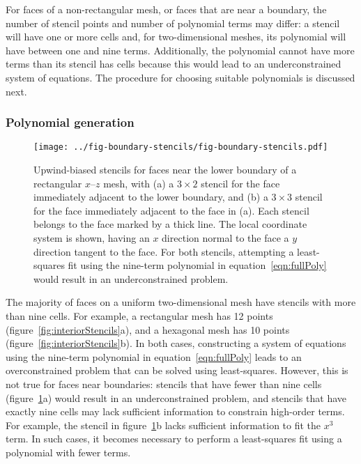 For faces of a non-rectangular mesh, or faces that are near a boundary, the number of stencil points and number of polynomial terms may differ: a stencil will have one or more cells and, for two-dimensional meshes, its polynomial will have between one and nine terms.  Additionally, the polynomial cannot have more terms than its stencil has cells because this would lead to an underconstrained system of equations.  The procedure for choosing suitable polynomials is discussed next.

\subsubsection{Polynomial generation}
\begin{figure}
	\centering
	\texttt{[image: ../fig-boundary-stencils/fig-boundary-stencils.pdf]}
	\caption{Upwind-biased stencils for faces near the lower boundary of a rectangular $x$--$z$ mesh, with (a) a $3 \times 2$ stencil for the face immediately adjacent to the lower boundary, and (b) a $3 \times 3$ stencil for the face immediately adjacent to the face in (a).  Each stencil belongs to the face marked by a thick line.  The local coordinate system is shown, having an $x$ direction normal to the face a $y$ direction tangent to the face.  For both stencils, attempting a least-squares fit using the nine-term polynomial in equation~\eqref{eqn:fullPoly} would result in an underconstrained problem.
	}
	\label{fig:boundaryStencils}
\end{figure}

The majority of faces on a uniform two-dimensional mesh have stencils with more than nine cells.  For example, a rectangular mesh has 12 points (figure~\ref{fig:interiorStencils}a), and a hexagonal mesh has 10 points (figure~\ref{fig:interiorStencils}b).
In both cases, constructing a system of equations using the nine-term polynomial in equation~\eqref{eqn:fullPoly} leads to an overconstrained problem that can be solved using least-squares.  However, this is not true for faces near boundaries: stencils that have fewer than nine cells (figure~\ref{fig:boundaryStencils}a) would result in an underconstrained problem, and stencils that have exactly nine cells may lack sufficient information to constrain high-order terms.  For example, the stencil in figure~\ref{fig:boundaryStencils}b lacks sufficient information to fit the $x^3$ term.  In such cases, it becomes necessary to perform a least-squares fit using a polynomial with fewer terms.


